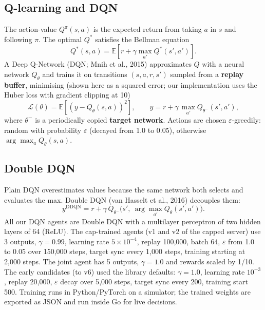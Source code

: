 \subsection{Q-learning and DQN}
The action-value $Q^\pi(s,a)$ is the expected return from taking $a$ in $s$ and following $\pi$. The optimal $Q^*$ satisfies the Bellman equation
\begin{equation}
Q^*(s,a) = \mathbb{E}\left[r + \gamma \max_{a'} Q^*(s', a')\right].
\end{equation}
A Deep Q-Network (DQN; Mnih et al., 2015) approximates $Q$ with a neural network $Q_\theta$ and trains it on transitions $(s,a,r,s')$ sampled from a \textbf{replay buffer}, minimising (shown here as a squared error; our implementation uses the Huber loss with gradient clipping at 10)
\begin{equation}
\mathcal{L}(\theta) = \mathbb{E}\left[\left(y - Q_\theta(s,a)\right)^2\right], \qquad y = r + \gamma\,\max_{a'} Q_{\theta^-}(s',a'),
\end{equation}
where $\theta^-$ is a periodically copied \textbf{target network}. Actions are chosen $\varepsilon$-greedily: random with probability $\varepsilon$ (decayed from 1.0 to 0.05), otherwise $\arg\max_a Q_\theta(s,a)$.

\subsection{Double DQN}
Plain DQN overestimates values because the same network both selects and evaluates the max. Double DQN (van Hasselt et al., 2016) decouples them:
\begin{equation}
y^{\text{DDQN}} = r + \gamma\, Q_{\theta^-}\!\Big(s',\ \arg\max_{a'} Q_\theta(s',a')\Big).
\end{equation}
All our DQN agents are Double DQN with a multilayer perceptron of two hidden layers of 64 (ReLU). The cap-trained agents (v1 and v2 of the capped server) use 3 outputs, $\gamma=0.99$, learning rate $5\times10^{-4}$, replay 100{,}000, batch 64, $\varepsilon$ from 1.0 to 0.05 over 150{,}000 steps, target sync every 1{,}000 steps, training starting at 2{,}000 steps. The joint agent has 5 outputs, $\gamma=1.0$ and rewards scaled by 1/10. The early candidates (to v6) used the library defaults: $\gamma=1.0$, learning rate $10^{-3}$, replay 20{,}000, $\varepsilon$ decay over 5{,}000 steps, target sync every 200, training start 500. Training runs in Python/PyTorch on a simulator; the trained weights are exported as JSON and run inside Go for live decisions.


